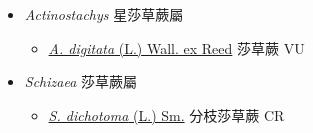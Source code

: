 
  \begin{itemize}
 \item[    ] \textit{Actinostachys} 星莎草蕨屬
                                
  \begin{itemize}
        \item[] \href{http://www.theplantlist.org/tpl1.1/search?q=Actinostachys+digitata}{\textit{A. digitata} (L.) Wall. ex Reed}   莎草蕨   VU
  \end{itemize}
 \item[    ] \textit{Schizaea} 莎草蕨屬
                                
  \begin{itemize}
        \item[] \href{http://www.theplantlist.org/tpl1.1/search?q=Schizaea+dichotoma}{\textit{S. dichotoma} (L.) Sm.}   分枝莎草蕨   CR
  \end{itemize}
  \end{itemize}

